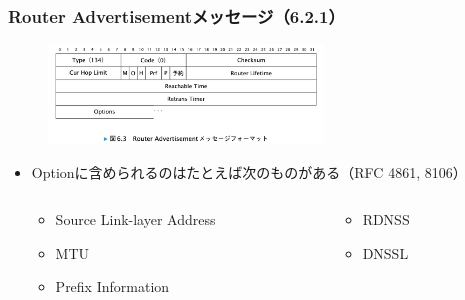 \begin{frame}
  \frametitle{Router Advertisementメッセージ（6.2.1）}
  \begin{center}
    \begin{figure}
      \includegraphics[width=0.65\textwidth]{img/figure6_3.png}
    \end{figure}
  \end{center}

  \begin{itemize}
    \item Optionに含められるのはたとえば次のものがある（RFC 4861, 8106）
    \begin{center}
      \begin{columns}
        \begin{column}{0.4\textwidth}
          \begin{itemize}
            \item Source Link-layer Address
            \item MTU
            \item Prefix Information
          \end{itemize}
        \end{column}
        \begin{column}{0.4\textwidth}
          \begin{itemize}
            \item RDNSS
            \item DNSSL
          \end{itemize}
        \end{column}
      \end{columns}
    \end{center}
  \end{itemize}
\end{frame}


